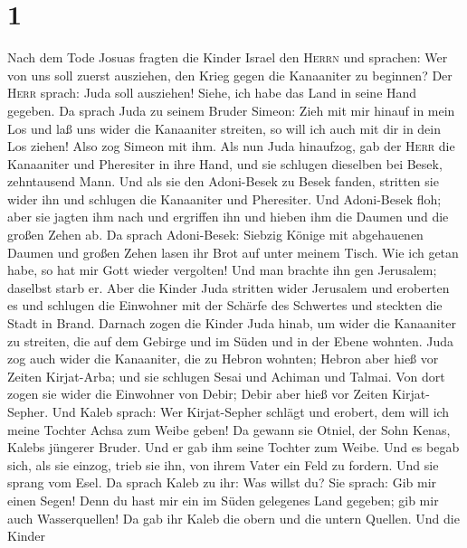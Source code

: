 \hypertarget{section}{%
\section{1}\label{section}}

 Nach dem Tode Josuas fragten die Kinder Israel den
\textsc{Herrn} und sprachen: Wer von uns soll zuerst ausziehen, den
Krieg gegen die Kanaaniter zu beginnen?  Der \textsc{Herr}
sprach: Juda soll ausziehen! Siehe, ich habe das Land in seine Hand
gegeben.  Da sprach Juda zu seinem Bruder Simeon: Zieh mit
mir hinauf in mein Los und laß uns wider die Kanaaniter streiten, so
will ich auch mit dir in dein Los ziehen! Also zog Simeon mit ihm.
 Als nun Juda hinaufzog, gab der \textsc{Herr} die
Kanaaniter und Pheresiter in ihre Hand, und sie schlugen dieselben bei
Besek, zehntausend Mann.  Und als sie den Adoni-Besek zu
Besek fanden, stritten sie wider ihn und schlugen die Kanaaniter und
Pheresiter.  Und Adoni-Besek floh; aber sie jagten ihm
nach und ergriffen ihn und hieben ihm die Daumen und die großen Zehen
ab.  Da sprach Adoni-Besek: Siebzig Könige mit abgehauenen
Daumen und großen Zehen lasen ihr Brot auf unter meinem Tisch. Wie ich
getan habe, so hat mir Gott wieder vergolten! Und man brachte ihn gen
Jerusalem; daselbst starb er.  Aber die Kinder Juda
stritten wider Jerusalem und eroberten es und schlugen die Einwohner mit
der Schärfe des Schwertes und steckten die Stadt in Brand.
 Darnach zogen die Kinder Juda hinab, um wider die
Kanaaniter zu streiten, die auf dem Gebirge und im Süden und in der
Ebene wohnten.  Juda zog auch wider die Kanaaniter, die
zu Hebron wohnten; Hebron aber hieß vor Zeiten Kirjat-Arba; und sie
schlugen Sesai und Achiman und Talmai.  Von dort zogen
sie wider die Einwohner von Debir; Debir aber hieß vor Zeiten
Kirjat-Sepher.  Und Kaleb sprach: Wer Kirjat-Sepher
schlägt und erobert, dem will ich meine Tochter Achsa zum Weibe geben!
 Da gewann sie Otniel, der Sohn Kenas, Kalebs jüngerer
Bruder. Und er gab ihm seine Tochter zum Weibe.  Und es
begab sich, als sie einzog, trieb sie ihn, von ihrem Vater ein Feld zu
fordern. Und sie sprang vom Esel. Da sprach Kaleb zu ihr: Was willst du?
 Sie sprach: Gib mir einen Segen! Denn du hast mir ein im
Süden gelegenes Land gegeben; gib mir auch Wasserquellen! Da gab ihr
Kaleb die obern und die untern Quellen.  Und die Kinder
